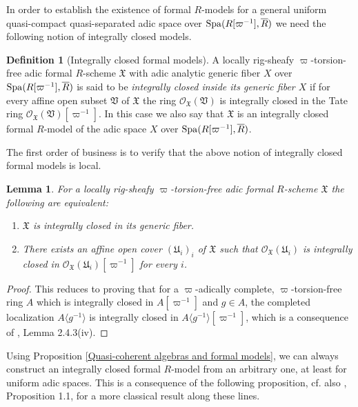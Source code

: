 \documentclass[12pt,twoside,a4paper]{article}
\newtheorem{lemma}[thm]{Lemma}
\theoremstyle{definition}
\newtheorem{mydef}[thm]{Definition}
\theoremstyle{remark}
\newcommand\Spa{{\rm Spa}}
\begin{document}
In order to establish the existence of formal $R$-models for a general uniform quasi-compact quasi-separated adic space over $\Spa(R[\varpi^{-1}], \overline{R})$ we need the following notion of integrally closed models.
\begin{mydef}[Integrally closed formal models]A locally rig-sheafy $\varpi$-torsion-free adic formal $R$-scheme $\mathfrak{X}$ with adic analytic generic fiber $X$ over $\Spa(R[\varpi^{-1}], \overline{R})$ is said to be \textit{integrally closed inside its generic fiber $X$} if for every affine open subset $\mathfrak{V}$ of $\mathfrak{X}$ the ring $\mathcal{O}_{\mathfrak{X}}(\mathfrak{V})$ is integrally closed in the Tate ring $\mathcal{O}_{\mathfrak{X}}(\mathfrak{V})[\varpi^{-1}]$. In this case we also say that $\mathfrak{X}$ is an integrally closed formal $R$-model of the adic space $X$ over $\Spa(R[\varpi^{-1}], \overline{R})$. \end{mydef}
The first order of business is to verify that the above notion of integrally closed formal models is local.
\begin{lemma}\label{Integrally closed formal models}For a locally rig-sheafy $\varpi$-torsion-free adic formal $R$-scheme $\mathfrak{X}$ the following are equivalent: \begin{enumerate}[(1)]\item $\mathfrak{X}$ is integrally closed in its generic fiber. \item There exists an affine open cover $(\mathfrak{U}_{i})_{i}$ of $\mathfrak{X}$ such that $\mathcal{O}_{\mathfrak{X}}(\mathfrak{U}_{i})$ is integrally closed in $\mathcal{O}_{\mathfrak{X}}(\mathfrak{U}_{i})[\varpi^{-1}]$ for every $i$.\end{enumerate}\end{lemma}
\begin{proof}This reduces to proving that for a $\varpi$-adically complete, $\varpi$-torsion-free ring $A$ which is integrally closed in $A[\varpi^{-1}]$ and $g\in A$, the completed localization $A\langle g^{-1}\rangle$ is integrally closed in $A\langle g^{-1}\rangle[\varpi^{-1}]$, which is a consequence of \cite{Huber0}, Lemma 2.4.3(iv).\end{proof}
Using Proposition \ref{Quasi-coherent algebras and formal models}, we can always construct an integrally closed formal $R$-model from an arbitrary one, at least for uniform adic spaces. This is a consequence of the following proposition, cf. also \cite{Pilloni-Stroh16}, Proposition 1.1, for a more classical result along these lines.
\end{document}
